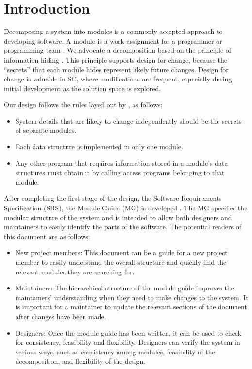 \documentclass[12pt, titlepage]{article}
\begin{document}
\newpage

\tableofcontents

\newpage


\section{Introduction}

Decomposing a system into modules is a commonly accepted approach to developing
software.  A module is a work assignment for a programmer or programming
team \cite{Parnas:EAll:1984}.  We advocate a decomposition
based on the principle of information hiding \cite{Parnas:1972}.  This
principle supports design for change, because the ``secrets'' that each module
hides represent likely future changes.  Design for change is valuable in SC,
where modifications are frequent, especially during initial development as the
solution space is explored.  

Our design follows the rules layed out by \cite{Parnas:EAll:1984}, as follows:
\begin{itemize}
\item System details that are likely to change independently should be the
  secrets of separate modules.
\item Each data structure is implemented in only one module.
\item Any other program that requires information stored in a module's data
  structures must obtain it by calling access programs belonging to that module.
\end{itemize}

After completing the first stage of the design, the Software Requirements
Specification (SRS), the Module Guide (MG) is developed \cite{Parnas:EAll:1984}. The MG
specifies the modular structure of the system and is intended to allow both
designers and maintainers to easily identify the parts of the software.  The
potential readers of this document are as follows:

\begin{itemize}
\item New project members: This document can be a guide for a new project member
  to easily understand the overall structure and quickly find the
  relevant modules they are searching for.
\item Maintainers: The hierarchical structure of the module guide improves the
  maintainers' understanding when they need to make changes to the system. It is
  important for a maintainer to update the relevant sections of the document
  after changes have been made.
\item Designers: Once the module guide has been written, it can be used to
  check for consistency, feasibility and flexibility. Designers can verify the
  system in various ways, such as consistency among modules, feasibility of the
  decomposition, and flexibility of the design.
\end{itemize}
\end{document}
